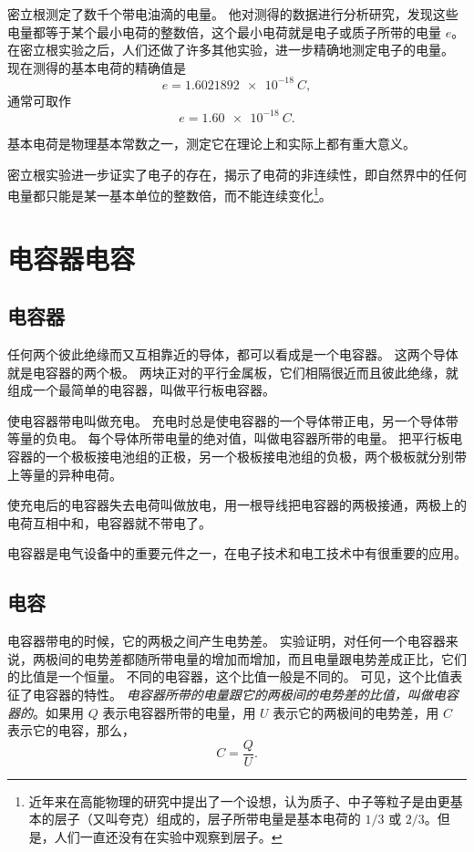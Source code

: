 密立根测定了数千个带电油滴的电量。
他对测得的数据进行分析研究，发现这些电量都等于某个最小电荷的整数倍，这个最小电荷就是电子或质子所带的电量 $e$。
在密立根实验之后，人们还做了许多其他实验，进一步精确地测定电子的电量。
现在测得的基本电荷的精确值是
\[e=\qty{1.6021892e-18}{C},\]
通常可取作
\[e=\qty{1.60e-18}{C}.\]

基本电荷是物理基本常数之一，测定它在理论上和实际上都有重大意义。

密立根实验进一步证实了电子的存在，揭示了电荷的非连续性，即自然界中的任何电量都只能是某一基本单位的整数倍，而不能连续变化\footnote{近年来在高能物理的研究中提出了一个设想，认为质子、中子等粒子是由更基本的层子（又叫夸克）组成的，层子所带电量是基本电荷的 $1/3$ 或 $2/3$。但是，人们一直还没有在实验中观察到层子。}。

\section{电容器\texorpdfstring{\quad}{ }电容}
\subsection{电容器}
任何两个彼此绝缘而又互相靠近的导体，都可以看成是一个电容器。
这两个导体就是电容器的两个极。
两块正对的平行金属板，它们相隔很近而且彼此绝缘，就组成一个最简单的电容器，叫做平行板电容器。

使电容器带电叫做充电。
充电时总是使电容器的一个导体带正电，另一个导体带等量的负电。
每个导体所带电量的绝对值，叫做电容器所带的电量。
把平行板电容器的一个极板接电池组的正极，另一个极板接电池组的负极，两个极板就分别带上等量的异种电荷。

使充电后的电容器失去电荷叫做放电，用一根导线把电容器的两极接通，两极上的电荷互相中和，电容器就不带电了。

电容器是电气设备中的重要元件之一，在电子技术和电工技术中有很重要的应用。

\subsection{电容}
电容器带电的时候，它的两极之间产生电势差。
实验证明，对任何一个电容器来说，两极间的电势差都随所带电量的增加而增加，而且电量跟电势差成正比，它们的比值是一个恒量。
不同的电容器，这个比值一般是不同的。
可见，这个比值表征了电容器的特性。
\emph{电容器所带的电量跟它的两极间的电势差的比值，叫做电容器的}。如果用 $Q$ 表示电容器所带的电量，用 $U$ 表示它的两极间的电势差，用 $C$ 表示它的电容，那么，
\[C=\frac{Q}{U}.\]

